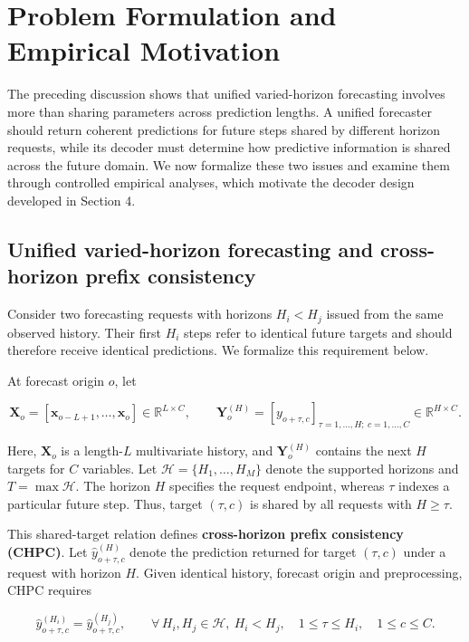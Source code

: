 \documentclass[final,3p,times]{elsarticle}
\newif\ifshowrevisions
\newcommand{\rev}[1]{\ifshowrevisions\textcolor{revisionblue}{#1}\else#1\fi}
\begin{document}
\section{Problem Formulation and Empirical Motivation}
\label{sec:problem-formulation}


The preceding discussion shows that \rev{unified varied-horizon forecasting} involves more than sharing parameters across prediction lengths. A unified forecaster should return coherent predictions for future steps shared by different horizon requests, while its decoder must determine how predictive information is shared across the future domain. We now formalize these two issues and examine them through controlled empirical analyses, which motivate the decoder design developed in Section 4.

\subsection{Unified varied-horizon forecasting and cross-horizon prefix consistency}


Consider two forecasting requests with horizons $H_i<H_j$ issued from the same observed history. Their first $H_i$ steps refer to identical future targets and should therefore receive identical predictions. We formalize this requirement below.

At forecast origin $o$, let

\[
\mathbf X_o
=
\left[\mathbf x_{o-L+1},\ldots,\mathbf x_o\right]
\in\mathbb R^{L\times C},
\qquad
\mathbf Y_o^{(H)}
=
\left[y_{o+\tau,c}\right]_{\tau=1,\ldots,H;\ c=1,\ldots,C}
\in\mathbb R^{H\times C}.
\]


Here, $\mathbf X_o$ is a length-$L$ multivariate history, and $\mathbf Y_o^{(H)}$ contains the next $H$ targets for $C$ variables. Let $\mathcal H=\{H_1,\ldots,H_M\}$ denote the supported horizons and $T=\max\mathcal H$. The horizon $H$ specifies the request endpoint, whereas $\tau$ indexes a particular future step. Thus, target $(\tau,c)$ is shared by all requests with $H\geq\tau$.

This shared-target relation defines \textbf{cross-horizon prefix consistency (CHPC)}. Let $\widehat y_{o+\tau,c}^{(H)}$ denote the prediction returned for target $(\tau,c)$ under a request with horizon $H$. Given identical history, forecast origin and preprocessing, CHPC requires

\[
\widehat y_{o+\tau,c}^{(H_i)}
=
\widehat y_{o+\tau,c}^{(H_j)},
\qquad
\forall\,H_i,H_j\in\mathcal H,\ H_i<H_j,\quad
1\leq\tau\leq H_i,\quad
1\leq c\leq C.
\]
\end{document}
